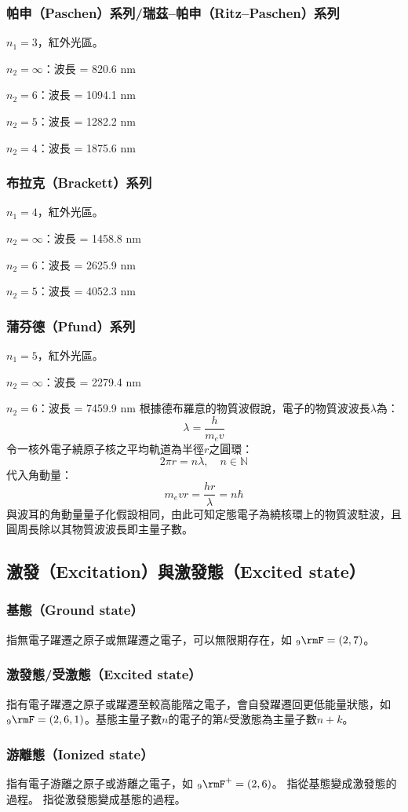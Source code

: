 \documentclass[a4paper,12pt]{report}
\begin{document}
\subsubsection{帕申（Paschen）系列/瑞茲–帕申（Ritz–Paschen）系列}
$n_1 = 3$，紅外光區。
\bit
\item $n_2=\infty$：波長 = 820.6 nm
\item $n_2=6$：波長 = 1094.1 nm
\item $n_2=5$：波長 = 1282.2 nm
\item $n_2=4$：波長 = 1875.6 nm
\eit
\subsubsection{布拉克（Brackett）系列}
$n_1 = 4$，紅外光區。
\bit
\item $n_2=\infty$：波長 = 1458.8 nm
\item $n_2=6$：波長 = 2625.9 nm
\item $n_2=5$：波長 = 4052.3 nm
\eit
\subsubsection{蒲芬德（Pfund）系列}
$n_1 = 5$，紅外光區。
\bit
\item $n_2=\infty$：波長 = 2279.4 nm
\item $n_2=6$：波長 = 7459.9 nm
\eit
{}
根據德布羅意的物質波假說，電子的物質波波長$\lambda$為：
\[\lambda=\frac{h}{m_ev}\]
令一核外電子繞原子核之平均軌道為半徑$r$之圓環：
\[2\pi r=n\lambda,\quad n\in\mathbb{N}\]
代入角動量：
\[m_evr=\frac{hr}{\lambda}=n\hbar\]
與波耳的角動量量子化假設相同，由此可知定態電子為繞核環上的物質波駐波，且圓周長除以其物質波波長即主量子數。
\subsection{激發（Excitation）與激發態（Excited state）}
\subsubsection{基態（Ground state）}
指無電子躍遷之原子或無躍遷之電子，可以無限期存在，如 $_9\rmF = (2, 7)$。
\subsubsection{激發態/受激態（Excited state）}
指有電子躍遷之原子或躍遷至較高能階之電子，會自發躍遷回更低能量狀態，如 $_9\rmF = (2, 6, 1)$。基態主量子數$n$的電子的第$k$受激態為主量子數$n+k$。
\subsubsection{游離態（Ionized state）}
指有電子游離之原子或游離之電子，如 $_9\rmF^+ = (2, 6)$。
指從基態變成激發態的過程。
指從激發態變成基態的過程。
\end{document}
